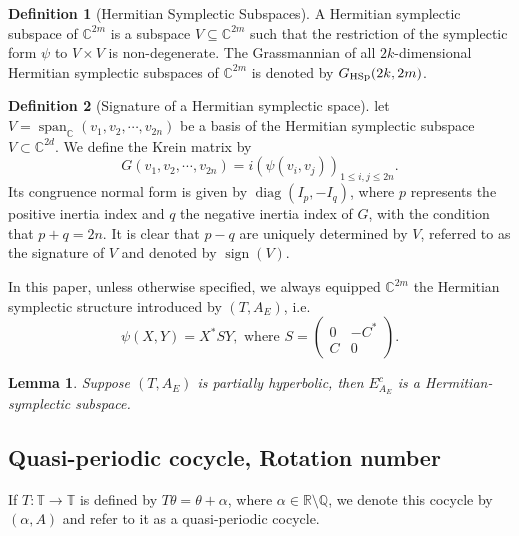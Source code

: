 \documentclass[11pt]{amsart}
\newtheorem{lemma}[theorem]{Lemma}
\theoremstyle{remark}
\theoremstyle{definition}
\newtheorem{definition}{Definition}
\newcommand{\C}{{\mathbf C}}
\newcommand{\HSp}{{\rm HSp}}
\def \C{{\mathcal{C}}}
\def\C{{\mathbb C}}
\begin{document}
\begin{definition}[Hermitian Symplectic Subspaces]
A Hermitian symplectic subspace of \( \mathbb{C}^{2m} \) is a subspace \( V \subseteq \mathbb{C}^{2m} \) such that the restriction of the symplectic form \( \psi \) to \( V \times V \) is non-degenerate. The Grassmannian of all \( 2k \)-dimensional Hermitian symplectic subspaces of \( \mathbb{C}^{2m} \) is denoted by \( G_{\HSp}(2k, 2m) \).
\end{definition}
\begin{definition}[Signature of a Hermitian symplectic space]
    let $V=\operatorname{span}_{\C}(v_1,v_2,\cdots,v_{2n})$ be a basis of 
the Hermitian symplectic subspace $V \subset \C^{2d}$. We define the  Krein matrix by  
\begin{equation*}
G(v_1,v_2,\cdots,v_{2n})=i(\psi(v_i,v_j))_{1\leq i,j\leq2n} .
\end{equation*}
 Its congruence normal form is given by $ \operatorname{diag}(I_p, -I_q) $, where $ p $ represents the positive inertia index and $ q $ the negative inertia index of $ G $, with the condition that $ p + q = 2n $. It is clear that $ p - q $ are uniquely determined by $V $, referred to as the signature  of $ V $ and denoted by $ \operatorname{sign}(V) $.
\end{definition}



In this paper, unless otherwise specified, we always equipped $\C^{2m}$ the Hermitian symplectic structure introduced by $(T,A_E)$, i.e. 
\begin{equation}\label{syms}
    \psi(X,Y)=X^*SY, \text{ where } S=\begin{pmatrix}
	0&-C^*\\
	C&0
\end{pmatrix}.
\end{equation}
\begin{lemma}\label{wron11}\cite{GJ,WXZ}
   Suppose $(T, A_E)$ is partially hyperbolic, then $E^c_{A_E}$ is a Hermitian-symplectic subspace.    
\end{lemma}


\subsection{Quasi-periodic cocycle, Rotation number}


If \( T: \mathbb{T} \to \mathbb{T} \) is defined by \( T\theta = \theta + \alpha \), where \( \alpha \in \mathbb{R} \setminus \mathbb{Q} \), we denote this cocycle by \( (\alpha, A) \) and refer to it as a quasi-periodic cocycle.
\end{document}
